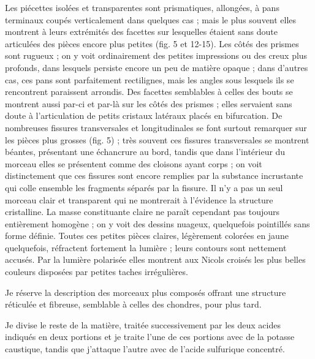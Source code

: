 \documentclass[a4paper, 12pt, oneside, french]{article}
\begin{document}
Les piécettes isolées et transparentes sont prismatiques, allongées, à pans terminaux coupés verticalement dans quelques cas ; mais le plus souvent elles montrent à leurs extrémités des facettes sur lesquelles étaient sans doute articulées des pièces encore plus petites (fig. 5 et 12-15). Les côtés des prismes sont rugueux ; on y voit ordinairement des petites impressions ou des creux plus profonds, dans lesquels persiste encore un peu de matière opaque ; dans d'autres cas, ces pans sont parfaitement rectilignes, mais les angles sous lesquels ils se rencontrent paraissent arrondis. Des facettes semblables à celles des bouts se montrent aussi par-ci et par-là sur les côtés des prismes ; elles servaient sans doute à l'articulation de petits cristaux latéraux placés en bifurcation. De nombreuses fissures transversales et longitudinales se font surtout remarquer sur les pièces plus grosses (fig. 5) ; très souvent ces fissures transversales se montrent béantes, présentant une échancrure au bord, tandis que dans l'intérieur du morceau elles se présentent comme des \og cloisons ayant corps \fg ; on voit distinctement que ces fissures sont encore remplies par la substance incrustante qui colle ensemble les fragments séparés par la fissure. Il n'y a pas un seul morceau clair et transparent qui ne montrerait à l'évidence la structure cristalline. La masse constituante claire ne paraît cependant pas toujours entièrement homogène ; on y voit des dessins nuageux, quelquefois pointillés sans forme définie. Toutes ces petites pièces claires, légèrement colorées en jaune quelquefois, réfractent fortement la lumière ; leurs contours sont nettement accusés. Par la lumière polarisée elles montrent aux Nicols croisés les plus belles couleurs disposées par petites taches irrégulières.

Je réserve la description des morceaux plus composés offrant une structure réticulée et fibreuse, semblable à celles des chondres, pour plus tard.

Je divise le reste de la matière, traitée successivement par les deux acides indiqués en deux portions et je traite l'une de ces portions avec de la potasse caustique, tandis que j'attaque l'autre avec de l'acide sulfurique concentré.
\end{document}
